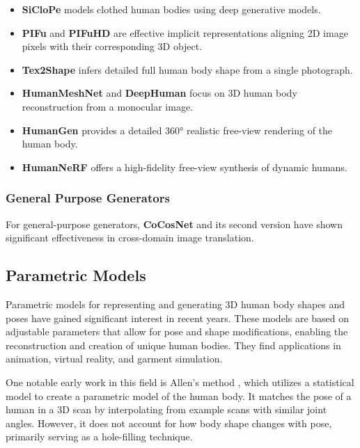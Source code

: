 \begin{itemize}
	\item \textbf{SiCloPe} \cite{DBLP:journals/corr/abs-1901-00049} models clothed human bodies using deep generative models.
	\item \textbf{PIFu} and \textbf{PIFuHD} \cite{pifu, pifuhd} are effective implicit representations aligning 2D image pixels with their corresponding 3D object.
	\item \textbf{Tex2Shape} \cite{alldieck2019tex2shape} infers detailed full human body shape from a single photograph.
	\item \textbf{HumanMeshNet} \cite{DBLP:journals/corr/abs-1908-06544} and \textbf{DeepHuman} \cite{DBLP:journals/corr/abs-1903-06473} focus on 3D human body reconstruction from a monocular image.
	\item \textbf{HumanGen} \cite{jiang2022humangen} provides a detailed 360° realistic free-view rendering of the human body.
	\item \textbf{HumanNeRF} \cite{weng_humannerf_2022_cvpr} offers a high-fidelity free-view synthesis of dynamic humans.
\end{itemize}

\subsubsection{General Purpose Generators}

For general-purpose generators, \textbf{CoCosNet} and its second version
\cite{Zhang_2020_CVPR, Zhou_2021_CVPR} have shown significant effectiveness in
cross-domain image translation.

\subsection{Parametric Models}

Parametric models for representing and generating 3D human body shapes and
poses have gained significant interest in recent years. These models are based
on adjustable parameters that allow for pose and shape modifications, enabling
the reconstruction and creation of unique human bodies. They find applications
in animation, virtual reality, and garment simulation.

One notable early work in this field is Allen's method \cite{allen:2003}, which
utilizes a statistical model to create a parametric model of the human body. It
matches the pose of a human in a 3D scan by interpolating from example scans
with similar joint angles. However, it does not account for how body shape
changes with pose, primarily serving as a hole-filling technique.

